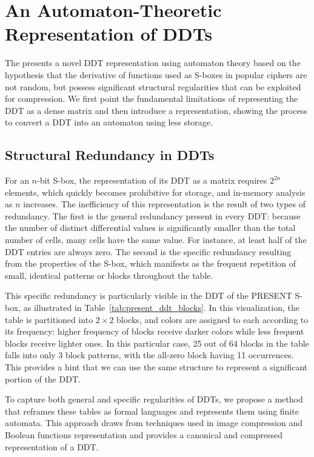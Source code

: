\section{An Automaton-Theoretic Representation of DDTs}
\label{sec:automaton}

The presents a novel DDT representation using automaton theory based on the hypothesis that the derivative of functions used as S-boxes in popular ciphers are not random, but possess significant structural regularities that can be exploited for compression. We first point the fundamental limitations of representing the DDT as a dense matrix and then introduce a representation, showing the process to convert a DDT into an automaton using less storage.

\subsection{Structural Redundancy in DDTs}
\label{sec:redundancies}

For an $n$-bit S-box, the representation of its DDT as a matrix requires $2^{2n}$ elements, which quickly becomes prohibitive for storage, and in-memory analysis as $n$ increases. The inefficiency of this representation is the result of two types of redundancy. The first is the general redundancy present in every DDT: because the number of distinct differential values is significantly smaller than the total number of cells, many cells have the same value. For instance, at least half of the DDT entries are always zero. The second is the specific redundancy resulting from the properties of the S-box, which manifests as the frequent repetition of small, identical patterns or blocks throughout the table.

This specific redundancy is particularly visible in the DDT of the PRESENT S-box, as illustrated in Table~\ref{tab:present_ddt_blocks}. In this visualization, the table is partitioned into $2 \times 2$ blocks, and colors are assigned to each according to its frequency: higher frequency of blocks receive darker colors while less frequent blocks receive lighter ones. In this particular case, 25 out of 64 blocks in the table falls into only 3 block patterns, with the all-zero block having 11 occurrences. This provides a hint that we can use the same structure to represent a significant portion of the DDT.



To capture both general and specific regularities of DDTs, we propose a method that reframes these tables as formal languages and represents them using finite automata. This approach draws from techniques used in image compression and Boolean functions representation and provides a canonical and compressed representation of a DDT.

